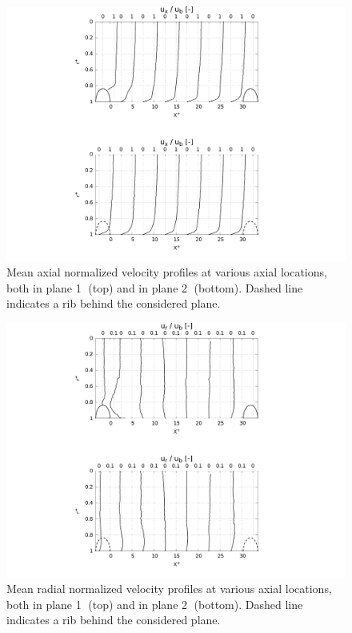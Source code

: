 \begin{figure}[!h]
\centering
\includegraphics[width=0.7\linewidth,keepaspectratio]{fig/applications/optim/Axial_vel.pdf}
\caption{Mean axial normalized velocity profiles at various axial locations, both in plane \textcircled{1} (top) and in plane \textcircled{2} (bottom). Dashed line indicates a rib behind the considered plane.}
\label{Ux_mean}
\end{figure}

\begin{figure}[!h]
\centering
\includegraphics[width=0.7\linewidth,keepaspectratio]{fig/applications/optim/Radial_vel.pdf}
\caption{Mean radial normalized velocity profiles at various axial locations, both in plane \textcircled{1} (top) and in plane \textcircled{2} (bottom). Dashed line indicates a rib behind the considered plane.}
\label{Ur_mean}
\end{figure}

